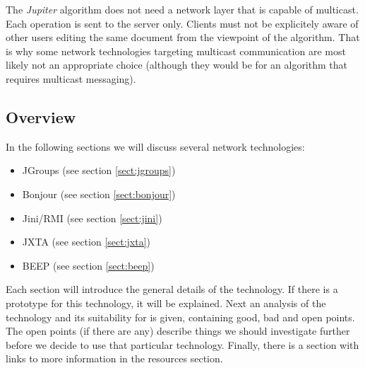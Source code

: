 The \emph{Jupiter} algorithm does not need a network layer that is capable of multicast. Each operation is sent to the server only. Clients must not be explicitely aware of other users editing the same document from the viewpoint of the algorithm. That is why some network technologies targeting multicast communication are most likely not an appropriate choice (although they would be for an algorithm that requires multicast messaging).


\subsection{Overview}
In the following sections we will discuss several network technologies:

\begin{itemize}
 \item JGroups (see section \ref{sect:jgroups})
 \item Bonjour (see section \ref{sect:bonjour})
 \item Jini/RMI (see section \ref{sect:jini})
 \item JXTA (see section \ref{sect:jxta})
 \item BEEP (see section \ref{sect:beep})
\end{itemize}

Each section will introduce the general details of the technology. If there is a prototype for this technology, it will be explained. Next an analysis of the technology and its suitability for \ace is given, containing good, bad and open points. The open points (if there are any) describe things we should investigate further before we decide to use that particular technology. Finally, there is a section with links to more information in the resources section.

